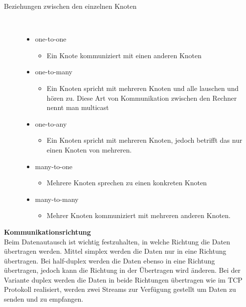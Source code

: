 \documentclass[a4paper,12pt]{article}
\begin{document}
\begin{description}
    \item[Beziehungen zwischen den einzelnen Knoten] ~\par
    \begin{itemize}
        \item one-to-one
        \begin{itemize}
            \item{Ein Knote kommuniziert mit einen anderen Knoten}
        \end{itemize}
        \item one-to-many
        \begin{itemize}
            \item{Ein Knoten spricht mit mehreren Knoten und alle lauschen und hören zu. Diese Art von Kommunikation zwischen den Rechner nennt man multicast}
        \end{itemize}
        \item one-to-any
        \begin{itemize}
            \item{Ein Knoten spricht mit mehreren Knoten, jedoch betrifft das nur einen Knoten von mehreren.}
        \end{itemize}
        \item many-to-one
        \begin{itemize}
            \item{Mehrere Knoten sprechen zu einen konkreten Knoten}
        \end{itemize}
        \item many-to-many
        \begin{itemize}
            \item{Mehrer Knoten kommuniziert mit mehreren anderen Knoten.\\}
        \end{itemize}
    \end{itemize} 
\end{description}
\textbf{Kommunikationsrichtung\\}
Beim Datenautausch ist wichtig festzuhalten, in welche Richtung die Daten übertragen werden. Mittel simplex werden die Daten nur in eine Richtung übertragen. 
Bei half-duplex werden die Daten ebenso in eine Richtung übertragen, jedoch kann die Richtung in der Übertragen wird änderen. Bei der Variante duplex werden die Daten in beide Richtungen übertragen wie im TCP Protokoll realisiert, werden zwei Streams
zur Verfügung gestellt um Daten zu senden und zu empfangen.\\\\\\\\
\end{document}
